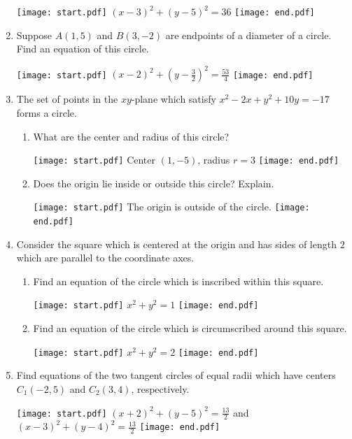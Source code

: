 \documentclass[12pt]{article}
\begin{document}
\begin{enumerate}
\texttt{[image: start.pdf]}
{$(x-3)^2+(y-5)^2=36$}
\texttt{[image: end.pdf]}


\item Suppose $A(1,5)$ and $B(3,-2)$ are endpoints of a diameter of a circle.  Find an equation of this circle.

\texttt{[image: start.pdf]}
{$(x-2)^2+\left(y-\frac{3}{2}\right)^2=\frac{53}{4}$}
\texttt{[image: end.pdf]}


\item The set of points in the $xy$-plane which satisfy $x^2-2x+y^2+10y=-17$ forms a circle.

\begin{enumerate}

\item What are the center and radius of this circle?

\texttt{[image: start.pdf]}
{Center $(1,-5)$, radius $r=3$}
\texttt{[image: end.pdf]}


\item Does the origin lie inside or outside this circle?  Explain.

\texttt{[image: start.pdf]}
{{The origin is outside of the circle.}}
\texttt{[image: end.pdf]}


\end{enumerate}

\item Consider the square which is centered at the origin and has sides of length $2$ which are parallel to the coordinate axes.

\begin{enumerate}

\item Find an equation of the circle which is inscribed within this square.

\texttt{[image: start.pdf]}
{{$x^2+y^2=1$}}
\texttt{[image: end.pdf]}


\item Find an equation of the circle which is circumscribed around this square.

\texttt{[image: start.pdf]}
{{$x^2+y^2=2$}}
\texttt{[image: end.pdf]}


\end{enumerate}

\item Find equations of the two tangent circles of equal radii which have centers $C_1(-2,5)$ and $C_2(3,4)$, respectively.

\texttt{[image: start.pdf]}
{{$(x+2)^2+(y-5)^2=\frac{13}{2}$ and $(x-3)^2+(y-4)^2=\frac{13}{2}$}}
\texttt{[image: end.pdf]}



\end{enumerate}
\end{document}
